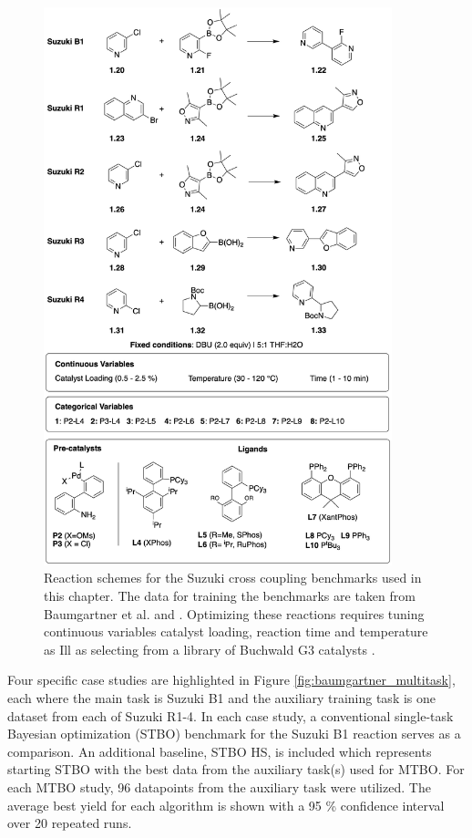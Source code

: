 \begin{figure}
    \centering
    \includegraphics[width=0.9\textwidth]{gfx/Chapter04/suzuki_benchmarks_thesis.png}
    \caption{Reaction schemes for the Suzuki cross coupling benchmarks used in this chapter. The data for training the benchmarks are taken from Baumgartner et al. \cite{Baumgartner2018} and \cite{Reizman2016b}. Optimizing these reactions requires tuning continuous variables catalyst loading, reaction time and temperature as Ill as selecting from a library of Buchwald G3 catalysts \cite{Bruno2013}.}
    \label{fig:benchmarks_suzuki}
\end{figure}

Four specific case studies are highlighted in Figure \ref{fig:baumgartner_multitask}, each where the main task is Suzuki B1 and the auxiliary training task is one dataset from each of Suzuki R1-4. In each case study, a conventional single-task Bayesian optimization (STBO) benchmark for the Suzuki B1 reaction serves as a comparison.  An additional baseline, STBO HS, is included which represents starting STBO with the best data from the auxiliary task(s) used for MTBO. For each MTBO study, 96 datapoints from the auxiliary task were utilized. The average best yield for each algorithm is shown with a 95 \% confidence interval over 20 repeated runs. 

